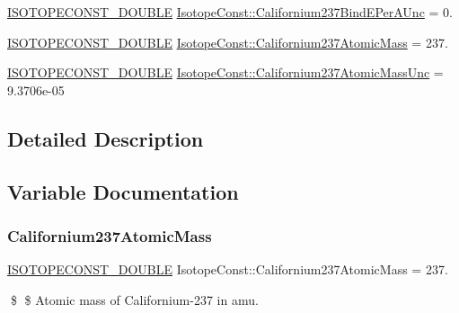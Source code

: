 \begin{DoxyCompactItemize}
\item 
\mbox{\hyperlink{group___isotope_const-_macros_ga8f45a7272ce02c0b4c65c44636ed719a}{I\+S\+O\+T\+O\+P\+E\+C\+O\+N\+S\+T\+\_\+\+D\+O\+U\+B\+LE}} \mbox{\hyperlink{group___isotope_const-_californium-_cf237_gac10aefacce5cc2e8f758ffb51935ac47}{Isotope\+Const\+::\+Californium237\+Bind\+E\+Per\+A\+Unc}} = 0.
\item 
\mbox{\hyperlink{group___isotope_const-_macros_ga8f45a7272ce02c0b4c65c44636ed719a}{I\+S\+O\+T\+O\+P\+E\+C\+O\+N\+S\+T\+\_\+\+D\+O\+U\+B\+LE}} \mbox{\hyperlink{group___isotope_const-_californium-_cf237_gab73110c56157664cc5bb721dfc869689}{Isotope\+Const\+::\+Californium237\+Atomic\+Mass}} = 237.
\item 
\mbox{\hyperlink{group___isotope_const-_macros_ga8f45a7272ce02c0b4c65c44636ed719a}{I\+S\+O\+T\+O\+P\+E\+C\+O\+N\+S\+T\+\_\+\+D\+O\+U\+B\+LE}} \mbox{\hyperlink{group___isotope_const-_californium-_cf237_gaba9bab5604a3235708137c689172d4e6}{Isotope\+Const\+::\+Californium237\+Atomic\+Mass\+Unc}} = 9.\+3706e-\/05
\end{DoxyCompactItemize}


\subsection{Detailed Description}


\subsection{Variable Documentation}
\mbox{\label{group___isotope_const-_californium-_cf237_gab73110c56157664cc5bb721dfc869689}} 
\subsubsection{\texorpdfstring{Californium237\+Atomic\+Mass}{Californium237AtomicMass}}
{\footnotesize\ttfamily \mbox{\hyperlink{group___isotope_const-_macros_ga8f45a7272ce02c0b4c65c44636ed719a}{I\+S\+O\+T\+O\+P\+E\+C\+O\+N\+S\+T\+\_\+\+D\+O\+U\+B\+LE}} Isotope\+Const\+::\+Californium237\+Atomic\+Mass = 237.}

\$ \$ Atomic mass of Californium-\/237 in amu. \mbox{\label{group___isotope_const-_californium-_cf237_gaba9bab5604a3235708137c689172d4e6}} 

